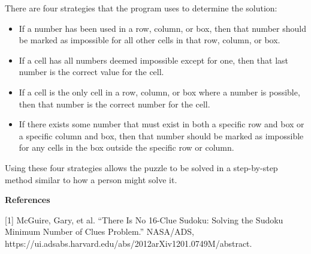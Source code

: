 \documentclass[11pt]{article}
\begin{document}
There are four strategies that the program uses to determine the solution:
\vspace{1\baselineskip}
\begin{itemize}
    \item{If a number has been used in a row, column, or box, 
    then that number should be marked as impossible for all other cells in that row, column, or box.}

    \item{If a cell has all numbers deemed impossible except for one, 
    then that last number is the correct value for the cell.}

    \item{If a cell is the only cell in a row, column, or box where a number is possible, 
    then that number is the correct number for the cell.}

    \item{If there exists some number that must exist in both a specific row and box or a specific column and box, 
    then that number should be marked as impossible for any cells in the box outside the specific row or column.}
\end{itemize}
Using these four strategies allows the puzzle to be solved in a step-by-step method similar to how a person might solve it.


\begin{center}
{\Large\textbf{References}}
\end{center}

\vspace{1\baselineskip}
[1] McGuire, Gary, et al. “There Is No 16-Clue Sudoku: Solving the Sudoku Minimum Number of Clues Problem.” NASA/ADS, https://ui.adsabs.harvard.edu/abs/2012arXiv1201.0749M/abstract. 


\printbibliography
\end{document}
